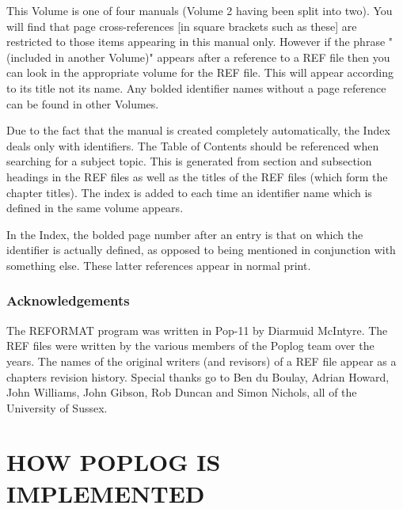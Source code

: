 This Volume is one of four manuals (Volume 2 having been split into
two). You will find that page cross-references [in square brackets such
as these] are restricted to those items appearing in this manual only.
However if the phrase "(included in another Volume)" appears after a
reference to a REF file then you can look in the appropriate volume for
the REF file. This will appear according to its title not its name.
Any bolded identifier names without a page reference can be found in
other Volumes.


Due to the fact that the manual is created completely automatically, the
Index deals only with identifiers. The Table of Contents should be
referenced when searching for a subject topic. This is generated from
section and subsection headings in the REF files as well as the titles
of the REF files (which form the chapter titles). The index is added to each
time an identifier name which is defined in the same volume appears.

In the Index, the bolded page number after an entry is that on
which the identifier is actually defined, as opposed to being mentioned
in conjunction with something else. These latter references appear in
normal print.


\section*{Acknowledgements}

The REFORMAT program was written in Pop-11 by Diarmuid McIntyre. The REF
files were written by the various members of the Poplog team over the
years. The names of the original writers (and revisors) of a REF file
appear as a chapters revision history. Special thanks go to Ben du
Boulay, Adrian Howard, John Williams, John Gibson, Rob Duncan and Simon
Nichols, all of the University of Sussex.



\tableofcontents






\part{HOW POPLOG IS IMPLEMENTED}


